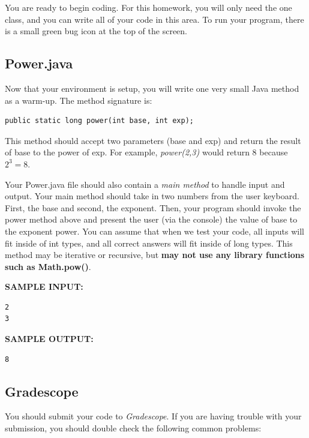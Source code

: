 \documentclass[paper=a4, fontsize=11pt, parskip=full]{scrartcl} %
\numberwithin{equation}{section} %
\numberwithin{figure}{section} %
\numberwithin{table}{section} %
\begin{document}
You are ready to begin coding. For this homework, you will only need the one class, and you can write all of your code in this area. To run your program, there is a small green bug icon at the top of the screen. 



\subsection{Power.java}

Now that your environment is setup, you will write one very small Java method as a warm-up. The method signature is:

\begin{lstlisting}
public static long power(int base, int exp);
\end{lstlisting}

This method should accept two parameters (base and exp) and return the result of base to the power of exp. For example, \emph{power(2,3)} would return 8 because $2^3=8$. 

Your Power.java file should also contain a \emph{main method} to handle input and output. Your main method should take in two numbers from the user keyboard. First, the base and second, the exponent. Then, your program should invoke the power method above and present the user (via the console) the value of base to the exponent power. You can assume that when we test your code, all inputs will fit inside of int types, and all correct answers will fit inside of long types. This method may be iterative or recursive, but \textbf{may not use any library functions such as Math.pow()}.

\textbf{SAMPLE INPUT:}

\begin{lstlisting}
2
3
\end{lstlisting}

\textbf{SAMPLE OUTPUT:}

\begin{lstlisting}
8
\end{lstlisting}

\subsection{Gradescope}

You should submit your code to \emph{Gradescope}. If you are having trouble with your submission, you should double check the following common problems:
\end{document}
